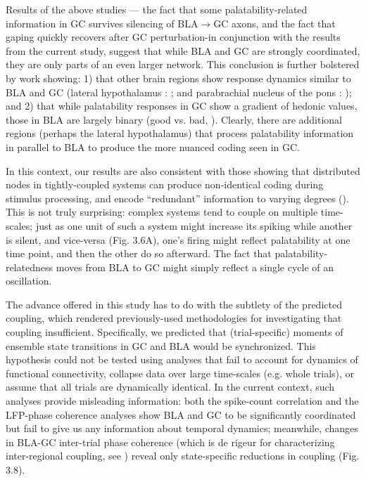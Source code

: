 \begin{refsection}
Results of the above studies --- the fact that some palatability-related information in GC survives silencing of BLA$\rightarrow$GC axons, and the fact that gaping quickly recovers after GC perturbation-in conjunction with the results from the current study, suggest that while BLA and GC are strongly coordinated, they are only parts of an even larger network. This conclusion is further bolstered by work showing: 1) that other brain regions show response dynamics similar to BLA and GC (lateral hypothalamus : \cite{li2013a}; and parabrachial nucleus of the pons : \cite{baez-santiago2016a}); and 2) that while palatability responses in GC show a gradient of hedonic values, those in BLA are largely binary (good vs. bad, \cite{fontanini2009a,sadacca2012a}). Clearly, there are additional regions (perhaps the lateral hypothalamus) that process palatability information in parallel to BLA to produce the more nuanced coding seen in GC. 

In this context, our results are also consistent with those showing that distributed nodes in tightly-coupled systems can produce non-identical coding during stimulus processing, and encode “redundant” information to varying degrees (\cite{siegel2015a,brincat2018a,lara2018a,saravani2019a}). This is not truly surprising: complex systems tend to couple on multiple time-scales; just as one unit of such a system might increase its spiking while another is silent, and vice-versa (Fig. 3.6A), one’s firing might reflect palatability at one time point, and then the other do so afterward. The fact that palatability-relatedness moves from BLA to GC might simply reflect a single cycle of an oscillation.

The advance offered in this study has to do with the subtlety of the predicted coupling, which rendered previously-used methodologies for investigating that coupling insufficient. Specifically, we predicted that (trial-specific) moments of ensemble state transitions in GC and BLA would be synchronized. This hypothesis could not be tested using analyses that fail to account for dynamics of functional connectivity, collapse data over large time-scales (e.g. whole trials), or assume that all trials are dynamically identical. In the current context, such analyses provide misleading information: both the spike-count correlation and the LFP-phase coherence analyses show BLA and GC to be significantly coordinated but fail to give us any information about temporal dynamics; meanwhile, changes in BLA-GC inter-trial phase coherence (which is de rigeur for characterizing inter-regional coupling, see \cite{engel2020a,kramer2020a,zareian2020a,zielinski2019a}) reveal only state-specific reductions in coupling (Fig. 3.8).


\end{refsection}
